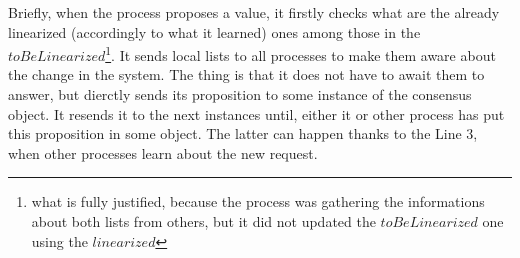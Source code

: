 \documentclass{article}
\theoremstyle{remark}
\begin{document}
Briefly, when the process proposes a value, it firstly checks what are the already linearized (accordingly to what it learned) ones among those in the $toBeLinearized$\footnote{what is fully justified, because the process was gathering the informations about both lists from others, but it did not updated the $toBeLinearized$ one using the $linearized$}. It sends local lists to all processes to make them aware about the change in the system. The thing is that it does not have to await them to answer, but dierctly sends its proposition to some instance of the consensus object. It resends it to the next instances until, either it or other process has put this proposition in some object. The latter can happen thanks to the Line 3, when other processes learn about the new request.
%
%
\end{document}
